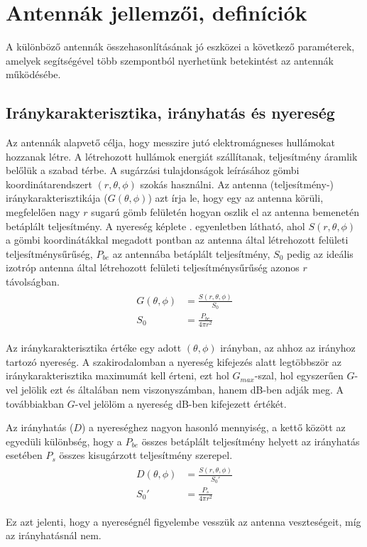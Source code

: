 \section{Antennák jellemzői, definíciók}
	A különböző antennák összehasonlításának jó eszközei a következő paraméterek, amelyek segítségével több szempontból nyerhetünk betekintést az antennák működésébe.
	\subsection{Iránykarakterisztika, irányhatás és nyereség}
		\par Az antennák alapvető célja, hogy messzire jutó elektromágneses hullámokat hozzanak létre. A létrehozott hullámok energiát szállítanak, teljesítmény áramlik belőlük a szabad térbe. A sugárzási tulajdonságok leírásához gömbi koordinátarendszert $(r, \theta, \phi)$ szokás használni. Az antenna (teljesítmény-) iránykarakterisztikája ($G(\theta, \phi)$) azt írja le, hogy egy az antenna körüli, megfelelően nagy $r$ sugarú gömb felületén hogyan oszlik el az antenna bemenetén betáplált teljesítmény. A nyereség képlete . egyenletben látható, ahol $S(r,\theta,\phi)$ a gömbi koordinátákkal megadott pontban az antenna által létrehozott felületi teljesítménysűrűség, $P_{be}$ az antennába betáplált teljesítmény, $S_0$ pedig az ideális izotróp antenna által létrehozott felületi teljesítménysűrűség azonos $r$ távolságban.
		\begin{align}
			\begin{split}
				\label{equ:G}
				G(\theta,\phi) & = \frac{S(r,\theta,\phi)}{S_0}\\
				S_0 & = \frac{P_{be}}{4\pi r^2}
			\end{split}
		\end{align}
		\par Az iránykarakterisztika értéke egy adott $(\theta, \phi)$ irányban, az ahhoz az irányhoz tartozó nyereség. A szakirodalomban a nyereség kifejezés alatt legtöbbször az iránykarakterisztika maximumát kell érteni, ezt hol $G_{max}$-szal, hol egyszerűen $G$-vel jelölik ezt és általában nem viszonyszámban, hanem dB-ben adják meg. A továbbiakban $G$-vel jelölöm a nyereség dB-ben kifejezett értékét.
		\par Az irányhatás ($D$) a nyereséghez nagyon hasonló mennyiség, a kettő között az egyedüli különbség, hogy a $P_{be}$ összes betáplált teljesítmény helyett az irányhatás esetében $P_{s}$ összes kisugárzott teljesítmény szerepel.
		\begin{align}
			\begin{split}\label{equ:D}
				D(\theta,\phi) & = \frac{S(r,\theta,\phi)}{S_0'}\\
				S_0' & = \frac{P_s}{4\pi r^2}
			\end{split}
		\end{align}
		\par Ez azt jelenti, hogy a nyereségnél figyelembe vesszük az antenna veszteségeit, míg az irányhatásnál nem.
